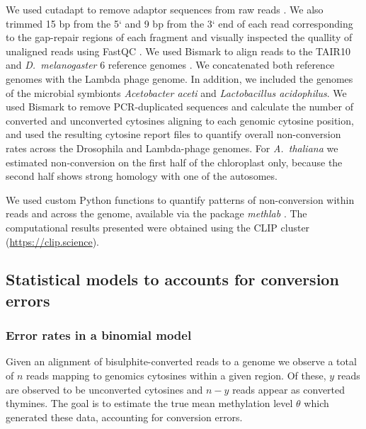 \documentclass[10pt,letterpaper]{article}
\begin{document}
We used cutadapt to remove adaptor sequences from raw reads \cite{martin2011cutadapt}.
We also trimmed 15 bp from the 5` and 9 bp from the 3` end of each read corresponding to the gap-repair regions of each fragment and visually inspected the quallity of unaligned reads using FastQC \cite{andrews2020fastqc}.
We used Bismark to align reads to the TAIR10 and \textit{D.~melanogaster} 6 reference genomes \cite{krueger2011bismark}.
We concatenated both reference genomes with the Lambda phage genome.
In addition, we included the genomes of the microbial symbionts \textit{Acetobacter aceti} and \textit{Lactobacillus acidophilus}.
We used Bismark to remove PCR-duplicated sequences and calculate the number of converted and unconverted cytosines aligning to each genomic cytosine position, and used the resulting cytosine report files to quantify overall non-conversion rates across the Drosophila and Lambda-phage genomes.
For \emph{A.~thaliana} we estimated non-conversion on the first half of the chloroplast only, because the second half shows strong homology with one of the autosomes.

We used custom Python functions to quantify patterns of non-conversion within reads and across the genome, available via the package \textit{methlab} \cite{ellis2023methlab}.
The computational results presented were obtained using the CLIP cluster (\url{https://clip.science}).

\subsection*{Statistical models to accounts for conversion errors}

\subsubsection*{Error rates in a binomial model} \label{sec:binomial-with-errors}

Given an alignment of bisulphite-converted reads to a genome we observe a total of $n$ reads mapping to genomics cytosines within a given region.
Of these, $y$ reads are observed to be unconverted cytosines and $n-y$ reads appear as converted thymines.
The goal is to estimate the true mean methylation level $\theta$ which generated these data, accounting for conversion errors.
\end{document}
